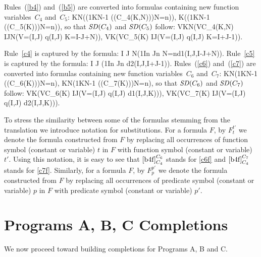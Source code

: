 \documentclass{article}
\newcommand{\sub}[3]{#1_{#2}^{#3}}
\begin{document}
Rules~(\ref{b4}) and~(\ref{b5})  are converted into formulas containing new function variables~$C_4$
and~$C_5$:
\beq
\forall KN\big((1\leq K\times N-1 \land\neg\big(\co(C_4(K,N))\big)\wedge N=n)\to\bot\big),
\beq
\forall K\big((1\leq K\times N-1 \land\neg\big(\co(C_5(K))\big)\wedge N=n)\to\bot\big),
so that  $\mathit{SD}(C_4)$ and $\mathit{SD}(C_5)$ follow: 
\beq
\forall VKN(V\in C_4(K,N) \lrar \exists IJN(V=(I,J) \land q(I,J)
   \land K=I-J+N)),
\beq
\forall VK(V\in C_5(K) \lrar \exists IJ(V=(I,J) \land q(I,J)
   \land K=I+J-1)).


Rule~\eqref{c4} is captured by the  formula:
\beq
\forall I J  N(1\leq I\leq n \leq J\leq n  
 \wedge N=n\to d1(I,J,I-J+N)).
Rule~\eqref{c5} is captured by the  formula:
\beq
\forall I J  (1\leq I\leq n \leq J\leq n 
 \to d2(I,J,I+J-1)).
Rules~(\ref{c6}) and~(\ref{c7})  are converted into formulas containing new function variables~$C_6$
and~$C_7$:
\beq
\forall KN(1\leq K\times N-1 \land\neg\big(\co(C_6(K))\big)\wedge N=n)\to\bot,
\beq
\forall KN(1\leq K\times N-1 \land\neg\big(\co(C_7(K))\big)\wedge N=n)\to\bot,
so that  $\mathit{SD}(C_6)$ and $\mathit{SD}(C_7)$ follow: 
\beq
\forall VK\Big(V\in C_6(K) \lrar \exists IJ\big(V=(I,J) \land q(I,J) \land d1(I,J,K)\big)\Big),
\beq
\forall VK\Big(V\in C_7(K) \lrar \exists IJ\big(V=(I,J) \land q(I,J) \land d2(I,J,K)\big)\Big).
\newpage

To stress the similarity between some of the formulas stemming from the translation we introduce notation for substitutions. For a formula $F$, by $\sub{F}{t}{t'}$ we denote the formula constructed from $F$ by replacing all occurrences of function symbol (constant or variable) $t$ in $F$ with function symbol (constant or variable) $t'$. 
Using this notation, it is easy to see that  $\sub{\eqref{b4f}}{C_4}{C_6}$ stands for \eqref{c6f}
and  $\sub{\eqref{b4f}}{C_4}{C_7}$ stands for \eqref{c7f}.
Similarly, for a formula $F$, by $\sub{F}{p}{p'}$ we denote the formula constructed from $F$ by replacing all occurrences of predicate symbol (constant or variable) $p$ in $F$ with predicate symbol (constant or variable) $p'$.


\section{Programs A, B, C Completions}
We now proceed toward building completions for Programs A, B and C. 
\end{document}
